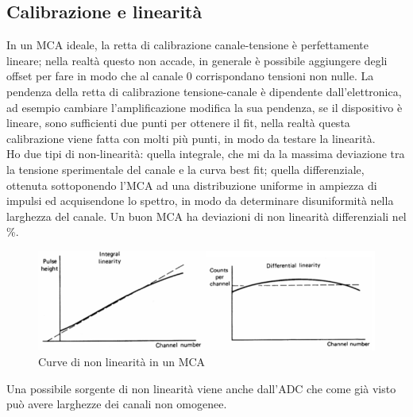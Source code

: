\subsection{Calibrazione e linearit\`a}
In un MCA ideale, la retta di calibrazione canale-tensione \`e perfettamente lineare; nella realt\`a questo non accade, in generale \`e possibile
aggiungere degli offset per fare in modo che al canale 0 corrispondano tensioni non nulle.
La pendenza della retta di calibrazione tensione-canale \`e dipendente dall'elettronica, ad esempio cambiare l'amplificazione modifica la sua pendenza,
se il dispositivo \`e lineare, sono sufficienti due punti per ottenere il fit, nella realt\`a questa calibrazione viene fatta con molti pi\`u punti, 
in modo da testare la linearit\`a.\\
Ho due tipi di non-linearit\`a: quella integrale, che mi da la massima deviazione tra la tensione sperimentale del canale e la curva best fit;
quella differenziale, ottenuta sottoponendo l'MCA ad una distribuzione uniforme in ampiezza di impulsi ed acquisendone lo spettro, in modo
da determinare disuniformit\`a nella larghezza del canale.
Un buon MCA ha deviazioni di non linearit\`a differenziali nel \%.
\begin{figure}[htbp]
\begin{center}
	\includegraphics[scale=0.60]{./Immagini/NonLinearitaMCA.png}
\caption{Curve di non linearit\`a in un MCA}
\end{center}
\end{figure}
Una possibile sorgente di non linearit\`a viene anche dall'ADC che come gi\`a visto pu\`o avere larghezze dei canali non omogenee.
